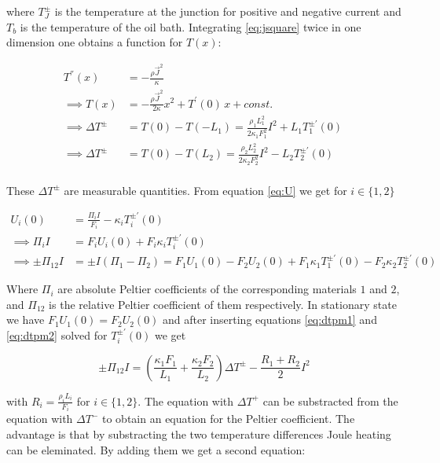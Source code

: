 \documentclass[a4paper]{article}
\begin{document}
where $T_J^{\pm}$ is the temperature at the junction for positive and negative current and $T_b$ is the temperature of the oil bath. Integrating \eqref{eq:jsquare} twice in one dimension one obtains a function for $T(x)$:

\begin{subequations}
\begin{align}
T^{''}(x) &= - \frac{\rho \vec{J}^2}{\kappa} \\
\implies T(x) &= -\frac{\rho \vec{J}^2}{2 \kappa} x^2 + T^{'}(0) \, x + const. \\	
\implies \Delta T^{\pm} &= T(0) - T(-L_1) = \frac{\rho_1 L_1^2}{2 \kappa_1 F_1^2} I^2 + L_1 T_1^{\pm'}(0) \ \label{eq:dtpm1} \\
\implies \Delta T^{\pm} &= T(0) - T(L_2) = \frac{\rho_2 L_2^2}{2 \kappa_2 F_2^2} I^2 - L_2 T_2^{\pm'}(0) \ \label{eq:dtpm2}\\
\end{align}
\end{subequations}

These $\Delta T^{\pm}$ are measurable quantities. From equation \eqref{eq:U} we get for $i \in \{1, 2\}$

\begin{subequations}
\begin{align}
U_i(0) &= \frac{\Pi_i I}{F_i} - \kappa_i T_i^{\pm'}(0) \\
\implies \Pi_i I &= F_i U_i(0) + F_i \kappa_i T_i^{\pm'}(0) \\
\implies \pm \Pi_{12} I &= \pm I \left( \Pi_1 - \Pi_2 \right) = F_1 U_1(0) - F_2 U_2(0) + F_1 \kappa_1 T_1^{\pm'}(0) - F_2 \kappa_2 T_2^{\pm'}(0)
\end{align}
\end{subequations}

Where $\Pi_i$ are absolute Peltier coefficients of the corresponding materials $1$ and $2$, and $\Pi_{12}$ is the relative Peltier coefficient of them respectively. In stationary state we have $F_1 U_1(0) = F_2 U_2(0)$ and after inserting equations \eqref{eq:dtpm1} and \eqref{eq:dtpm2} solved for $T_i^{\pm'}(0)$ we get

\begin{equation}
\pm \Pi_{12} I = \left( \frac{\kappa_1 F_1}{L_1} + \frac{\kappa_2 F_2}{L_2} \right) \Delta T^{\pm} - \frac{R_1 + R_2}{2} I^2 \label{eq:pmi}
\end{equation}

with $R_i = \frac{\rho_i L_i}{F_i}$ for $i \in \{1, 2\}$. The equation with $\Delta T^{+}$ can be substracted from the equation with $\Delta T^{-}$ to obtain an equation for the Peltier coefficient. The advantage is that by substracting the two temperature differences Joule heating can be eleminated. By adding them we get a second equation:
\end{document}
